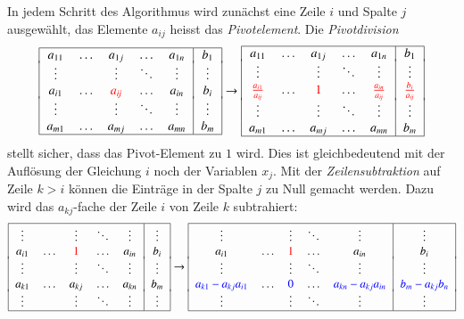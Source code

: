 In jedem Schritt des Algorithmus wird zunächst eine Zeile $i$ und
Spalte $j$ ausgewählt, das Elemente $a_{i\!j}$ heisst das {\em Pivotelement}.
%
Die {\em Pivotdivision}
\[
\begin{tabular}{|>{$}c<{$}>{$}c<{$}>{$}c<{$}>{$}c<{$}>{$}c<{$}|>{$}c<{$}|}
\hline
a_{11}&\dots &a_{1j}&\dots &a_{1n}&b_1   \\[-2pt]
\vdots&      &\vdots&\ddots&\vdots&\vdots\\
a_{i1}&\dots &{\color{red}a_{i\!j}}&\dots &a_{in}&b_i   \\[-2pt]
\vdots&      &\vdots&\ddots&\vdots&\vdots\\
a_{m1}&\dots &a_{mj}&\dots &a_{mn}&b_m   \\
\hline
\end{tabular}
\rightarrow
\begin{tabular}{|>{$}c<{$}>{$}c<{$}>{$}c<{$}>{$}c<{$}>{$}c<{$}|>{$}c<{$}|}
\hline
a_{11}&\dots &a_{1j}&\dots &a_{1n}&b_1   \\[-2pt]
\vdots&      &\vdots&\ddots&\vdots&\vdots\\
{\color{red}\frac{a_{i1}}{a_{i\!j}}}&\dots &{\color{red}1}&\dots &{\color{red}\frac{a_{in}}{a_{i\!j}}}&{\color{red}\frac{b_i}{a_{i\!j}}}\\[-2pt]
\vdots&      &\vdots&\ddots&\vdots&\vdots\\
a_{m1}&\dots &a_{mj}&\dots &a_{mn}&b_m   \\
\hline
\end{tabular}
\]
stellt sicher, dass das Pivot-Element zu $1$ wird.
Dies ist gleichbedeutend mit der Auflösung der Gleichung $i$ noch der
Variablen $x_j$.
Mit der {\em Zeilensubtraktion} auf Zeile $k>i$ können die Einträge in der
%
Spalte $j$ zu Null gemacht werden.
Dazu wird das $a_{kj}$-fache der Zeile $i$ von Zeile $k$ subtrahiert:
\[
\begin{tabular}{|>{$}c<{$}>{$}c<{$}>{$}c<{$}>{$}c<{$}>{$}c<{$}|>{$}c<{$}|}
\hline
\vdots&      &\vdots&\ddots&\vdots&\vdots\\
a_{i1}&\dots &{\color{red}1}&\dots &a_{in}&b_i   \\[-2pt]
\vdots&      &\vdots&\ddots&\vdots&\vdots\\
a_{k1}&\dots &a_{kj}&\dots &a_{kn}&b_m   \\[-2pt]
\vdots&      &\vdots&\ddots&\vdots&\vdots\\
\hline
\end{tabular}
\rightarrow
\begin{tabular}{|>{$}c<{$}>{$}c<{$}>{$}c<{$}>{$}c<{$}>{$}c<{$}|>{$}c<{$}|}
\hline
\vdots&      &\vdots&\ddots&\vdots&\vdots\\
a_{i1}&\dots &{\color{red}1}&\dots &a_{in}&b_i   \\[-2pt]
\vdots&      &\vdots&\ddots&\vdots&\vdots\\
{\color{blue}a_{k1}-a_{kj}a_{i1}}&\dots &{\color{blue}0}&\dots &{\color{blue}a_{kn}-a_{kj}a_{in}}&{\color{blue}b_m-a_{kj}b_{n}}\\[-2pt]
\vdots&      &\vdots&\ddots&\vdots&\vdots\\
\hline
\end{tabular}
\]
